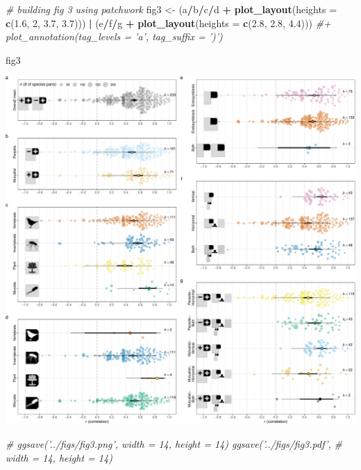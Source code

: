 \documentclass[
]{article}
\newenvironment{Shaded}{\begin{snugshade}}{\end{snugshade}}
\newcommand{\CommentTok}[1]{\textcolor[rgb]{0.56,0.35,0.01}{\textit{#1}}}
\newcommand{\DataTypeTok}[1]{\textcolor[rgb]{0.13,0.29,0.53}{#1}}
\newcommand{\DecValTok}[1]{\textcolor[rgb]{0.00,0.00,0.81}{#1}}
\newcommand{\FloatTok}[1]{\textcolor[rgb]{0.00,0.00,0.81}{#1}}
\newcommand{\KeywordTok}[1]{\textcolor[rgb]{0.13,0.29,0.53}{\textbf{#1}}}
\newcommand{\NormalTok}[1]{#1}
\newcommand{\OperatorTok}[1]{\textcolor[rgb]{0.81,0.36,0.00}{\textbf{#1}}}
\newcommand{\StringTok}[1]{\textcolor[rgb]{0.31,0.60,0.02}{#1}}
\begin{document}
\begin{Shaded}
\begin{Highlighting}[]
\CommentTok{# building fig 3 using patchwork}
\NormalTok{fig3 <-}\StringTok{ }\NormalTok{(a}\OperatorTok{/}\NormalTok{b}\OperatorTok{/}\NormalTok{c}\OperatorTok{/}\NormalTok{d }\OperatorTok{+}\StringTok{ }\KeywordTok{plot_layout}\NormalTok{(}\DataTypeTok{heights =} \KeywordTok{c}\NormalTok{(}\FloatTok{1.6}\NormalTok{, }\DecValTok{2}\NormalTok{, }\FloatTok{3.7}\NormalTok{, }\FloatTok{3.7}\NormalTok{))) }\OperatorTok{|}\StringTok{ }\NormalTok{(e}\OperatorTok{/}\NormalTok{f}\OperatorTok{/}\NormalTok{g }\OperatorTok{+}\StringTok{ }\KeywordTok{plot_layout}\NormalTok{(}\DataTypeTok{heights =} \KeywordTok{c}\NormalTok{(}\FloatTok{2.8}\NormalTok{, }
    \FloatTok{2.8}\NormalTok{, }\FloatTok{4.4}\NormalTok{)))  }\CommentTok{#+ plot_annotation(tag_levels = 'a', tag_suffix = ')')}

\NormalTok{fig3}
\end{Highlighting}
\end{Shaded}

\includegraphics{Supporting_Information_files/figure-latex/unnamed-chunk-38-1.pdf}

\begin{Shaded}
\begin{Highlighting}[]
\CommentTok{# ggsave('../figs/fig3.png', width = 14, height = 14) ggsave('../figs/fig3.pdf',}
\CommentTok{# width = 14, height = 14)}
\end{Highlighting}
\end{Shaded}
\end{document}
